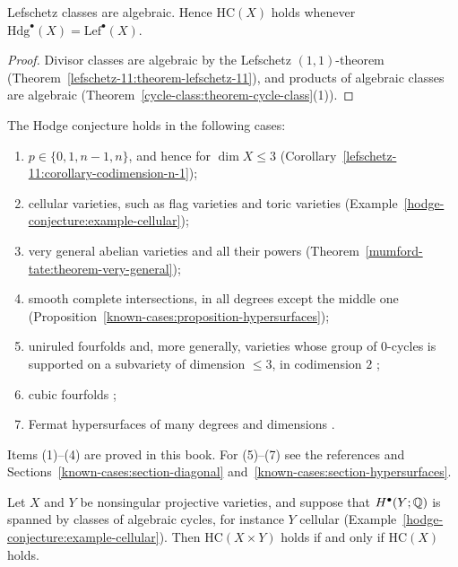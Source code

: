 \begin{proposition}\label{known-cases:proposition-lefschetz-classes}
Lefschetz classes are algebraic. Hence $\mathrm{HC}(X)$ holds whenever $\mathrm{Hdg}^\bullet(X) = \mathrm{Lef}^\bullet(X)$.
\end{proposition}

\begin{proof}
Divisor classes are algebraic by the Lefschetz $(1,1)$-theorem (Theorem~\ref{lefschetz-11:theorem-lefschetz-11}), and products of algebraic classes are algebraic
(Theorem~\ref{cycle-class:theorem-cycle-class}(1)).
\end{proof}

\begin{theorem}\label{known-cases:theorem-general}
The Hodge conjecture holds in the following cases:
\begin{enumerate}
\item $p \in \{0, 1, n - 1, n\}$, and hence for $\dim X \leq 3$ (Corollary~\ref{lefschetz-11:corollary-codimension-n-1});
\item cellular varieties, such as flag varieties and toric varieties (Example~\ref{hodge-conjecture:example-cellular});
\item very general abelian varieties and all their powers (Theorem~\ref{mumford-tate:theorem-very-general});
\item smooth complete intersections, in all degrees except the middle one (Proposition~\ref{known-cases:proposition-hypersurfaces});
\item uniruled fourfolds \cite{conte-murre-1978} and, more generally, varieties whose group of $0$-cycles is supported on a subvariety of dimension $\leq 3$, in codimension $2$
\cite{bloch-srinivas-1983};
\item cubic fourfolds \cite{zucker-1977};
\item Fermat hypersurfaces of many degrees and dimensions \cite{shioda-1979}.
\end{enumerate}
\end{theorem}

Items (1)--(4) are proved in this book. For (5)--(7) see the references and Sections~\ref{known-cases:section-diagonal} and~\ref{known-cases:section-hypersurfaces}.

\begin{proposition}\label{known-cases:proposition-cellular-factor}
Let $X$ and $Y$ be nonsingular projective varieties, and suppose that $H^\bullet(Y; \mathbb{Q})$ is spanned by classes of algebraic cycles, for instance $Y$ cellular (Example~\ref{hodge-conjecture:example-cellular}). Then
$\mathrm{HC}(X \times Y)$ holds if and only if $\mathrm{HC}(X)$ holds.
\end{proposition}

